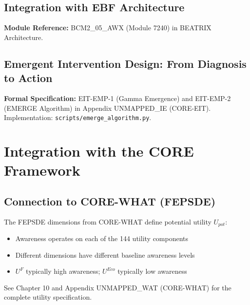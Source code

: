 \subsection{Integration with EBF Architecture}
\label{subsec:11-19-integration}



\begin{cross-reference}
\textbf{Module Reference:} BCM2\_05\_AWX (Module 7240) in BEATRIX Architecture.
\end{cross-reference}

\subsection{Emergent Intervention Design: From Diagnosis to Action}
\label{subsec:11-20-emergent-design}



\begin{cross-reference}
\textbf{Formal Specification:} EIT-EMP-1 (Gamma Emergence) and EIT-EMP-2 (EMERGE Algorithm)
in Appendix UNMAPPED_IE (CORE-EIT). Implementation: \texttt{scripts/emerge\_algorithm.py}.
\end{cross-reference}



\section{Integration with the CORE Framework}
\label{sec:awareness-9c-integration}


\subsection{Connection to CORE-WHAT (FEPSDE)}

\begin{cross-reference}
The FEPSDE dimensions from CORE-WHAT define potential utility $U_{pot}$:
\begin{itemize}[nosep]
  \item Awareness operates on each of the 144 utility components
  \item Different dimensions have different baseline awareness levels
  \item $U^F$ typically high awareness; $U^{Eco}$ typically low awareness
\end{itemize}
See Chapter 10 and Appendix UNMAPPED_WAT (CORE-WHAT) for the complete utility specification.
\end{cross-reference}


